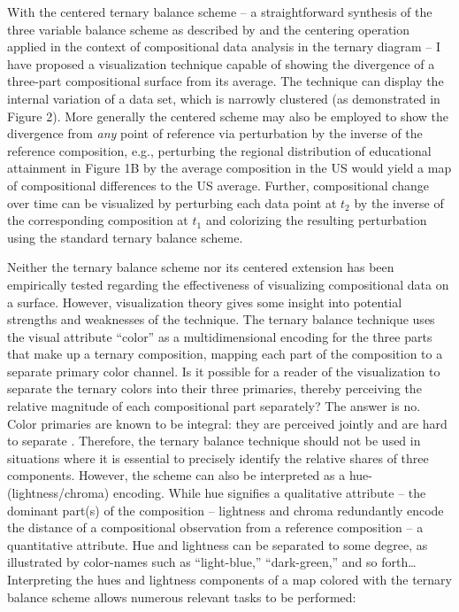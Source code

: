 \documentclass[10pt, twoside, parskip=half]{article}
\begin{document}
With the centered ternary balance scheme -- a straightforward synthesis
of the three variable balance scheme as described by \citet{Brewer1994}
and the centering operation applied in the context of compositional data
analysis in the ternary diagram \citep{VonEynatten2002} -- I have
proposed a visualization technique capable of showing the divergence of
a three-part compositional surface from its average. The technique can
display the internal variation of a data set, which is narrowly
clustered (as demonstrated in Figure 2). More generally the centered
scheme may also be employed to show the divergence from \emph{any} point
of reference via perturbation by the inverse of the reference
composition, e.g., perturbing the regional distribution of educational
attainment in Figure 1B by the average composition in the US would yield
a map of compositional differences to the US average. Further,
compositional change over time can be visualized by perturbing each data
point at \(t_2\) by the inverse of the corresponding composition at
\(t_1\) \citep{Aitchison2005a} and colorizing the resulting perturbation
using the standard ternary balance scheme.

Neither the ternary balance scheme nor its centered extension has been
empirically tested regarding the effectiveness of visualizing
compositional data on a surface. However, visualization theory gives
some insight into potential strengths and weaknesses of the technique.
The ternary balance technique uses the visual attribute ``color'' as a
multidimensional encoding for the three parts that make up a ternary
composition, mapping each part of the composition to a separate primary
color channel. Is it possible for a reader of the visualization to
separate the ternary colors into their three primaries, thereby
perceiving the relative magnitude of each compositional part separately?
The answer is no. Color primaries are known to be integral: they are
perceived jointly and are hard to separate \citep{Ware2013}. Therefore,
the ternary balance technique should not be used in situations where it
is essential to precisely identify the relative shares of three
components. However, the scheme can also be interpreted as a
hue-(lightness/chroma) encoding. While hue signifies a qualitative
attribute -- the dominant part(s) of the composition -- lightness and
chroma redundantly encode the distance of a compositional observation
from a reference composition -- a quantitative attribute. Hue and
lightness can be separated to some degree, as illustrated by color-names
such as ``light-blue,'' ``dark-green,'' and so forth\ldots{}
Interpreting the hues and lightness components of a map colored with the
ternary balance scheme allows numerous relevant tasks to be performed:
\end{document}
